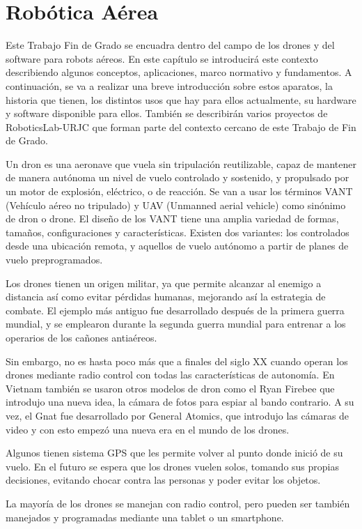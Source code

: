 \section{Robótica Aérea}

Este Trabajo Fin de Grado se encuadra dentro del campo de los drones y del software para
robots aéreos. En este capítulo se introducirá este contexto describiendo algunos conceptos, aplicaciones, marco normativo y fundamentos. A continuación, se va a realizar una breve introducción sobre estos aparatos, la historia que tienen, los distintos usos que hay para ellos actualmente, su hardware y software disponible para ellos. También se describirán varios proyectos de RoboticsLab-URJC que forman parte del contexto cercano de este Trabajo de Fin de Grado.

Un dron es una aeronave que vuela sin tripulación reutilizable, capaz de mantener de manera autónoma un nivel de vuelo controlado y sostenido, y propulsado por un motor de explosión, eléctrico, o de reacción. Se van a usar los términos VANT (Vehículo aéreo no tripulado) y UAV (Unmanned aerial vehicle) como sinónimo de dron o drone. El diseño de los VANT tiene una amplia variedad de formas, tamaños, configuraciones y características. Existen dos variantes: los controlados desde una ubicación remota, y aquellos de vuelo autónomo a partir de planes de vuelo preprogramados.

Los drones tienen un origen militar, ya que permite alcanzar al enemigo a distancia así como evitar pérdidas humanas, mejorando así la estrategia de combate. El ejemplo más antiguo fue desarrollado después de la primera guerra mundial, y se emplearon durante la segunda guerra mundial para entrenar a los operarios de los cañones antiaéreos. 

Sin embargo, no es hasta poco más que a finales del siglo XX cuando operan los drones mediante radio control con todas las características de autonomía. En Vietnam también se usaron otros modelos de dron como el Ryan Firebee que introdujo una nueva idea, la cámara de fotos para espiar al bando contrario. A su vez, el Gnat fue desarrollado por General Atomics, que introdujo las cámaras de video y con esto empezó una nueva era en el mundo de los drones.

Algunos tienen sistema GPS que les permite volver al punto donde inició de su vuelo. En el futuro se espera que los drones vuelen solos, tomando sus propias decisiones, evitando chocar contra las personas y poder evitar los objetos.

La mayoría de los drones se manejan con radio control, pero pueden ser también manejados y programadas mediante una tablet o un smartphone.

